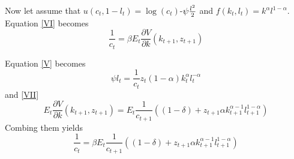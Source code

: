 \documentclass[a4paper,12pt]{article}
\begin{document}
Now let assume that $u\left( c_{t},1-l_{t}\right) =\log (c_{t})$-$\psi \frac{%
l^{2}}{2}$ and $f(k_{t},l_{t})=k^{\alpha }l^{1-\alpha }$. Equation \ref{VI}
becomes  
\begin{equation*}
\frac{1}{c_{t}}=\beta E_{t}\frac{\partial V}{\partial k}\left(
k_{t+1},z_{t+1}\right) 
\end{equation*}

Equation \ref{V} becomes 
\begin{equation*}
\psi l_{t}=\frac{1}{c_{t}}z_{t}\left( 1-\alpha \right) k_{t}^{\alpha
}l_{t}^{-\alpha }
\end{equation*}%
and \ref{VII} 
\begin{equation*}
E_{t}\frac{\partial V}{\partial k}\left( k_{t+1},z_{t+1}\right) =E_{t}\frac{1%
}{c_{t+1}}\left( \left( 1-\delta \right) +z_{t+1}\alpha k_{t+1}^{\alpha
-1}l_{t+1}^{1-\alpha }\right) 
\end{equation*}%
Combing them yields%
\begin{equation*}
\frac{1}{c_{t}}=\beta E_{t}\frac{1}{c_{t+1}}\left( \left( 1-\delta \right)
+z_{t+1}\alpha k_{t+1}^{\alpha -1}l_{t+1}^{1-\alpha }\right) 
\end{equation*}
\end{document}
